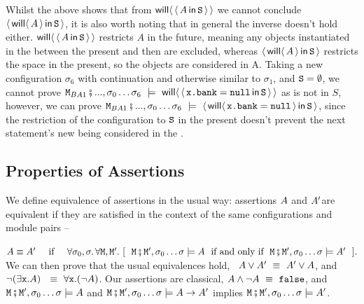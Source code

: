 Whilst the above shows that from $\Future { \Using{A}{\SF} }$ we cannot conclude $\Using { \Future{A} }{\SF}$, it is also worth noting that in general the inverse doesn't hold either. $\Future { \Using{A}{\SF} }$ restricts $A$ in the future, meaning any objects instantiated in the between the present and then are excluded, whereas $\Using { \Future{A} }{\SF}$ restricts the space in the present, so the objects are considered in A. Taking a new configuration $\sigma_6$  with continuation  and otherwise similar to $\sigma_1$, and $\SF = \emptyset$, we cannot prove $\M_{BA1}\mkpair ..., \sigma_0 \ldots \sigma_6 \ \models \ \Future{ \Using { \prg{x.bank} = \prg{null} } {\SF}}$  as  is not in $S$, however, we can prove $\M_{BA1}\mkpair ..., \sigma_0 \ldots \sigma_6 \ \models \ \Using { \Future{ \prg{x.bank} = \prg{null} } } {\SF}$, since the restriction of the configuration to $\SF$ in the present doesn't prevent the next statement's new  being considered in the \Future{\cdot}.


\subsection{Properties of Assertions}

 
\label{sect:classical} 
We define equivalence of   assertions in the usual way: assertions $\A$ and $\A'$are equivalent if they are satisfied  in
the context of the same configurations and module pairs -- \ie\\
 \strut{} \hspace{1.1cm} $\A \equiv \A'\  \IFF\    \forall \sigma_0, \sigma.\, \forall \M, \M'. \ [\ \ \M\mkpair \M', \sigma_0\ldots\sigma \models \A\ \mbox{ if and only if }\ \M\mkpair \M', \sigma_0\ldots\sigma \models \A'\ \ ].$\\
We can then prove that the usual equivalences hold, \eg\  $ \A \vee \A' \ \equiv \  \A' \vee \A$, and\   $\neg (\exists \prg{x}.\A )  \  \ \equiv \  \forall \prg{x}.(\neg  \A)$.
%
Our assertions are classical, \eg  $ \A \wedge\neg \A \ \equiv \  \prg{false}$, and $\M\mkpair \M', \sigma_0 \ldots \sigma  \models \A$ and  $\M\mkpair \M', \sigma_0 \ldots \sigma  \models \A \rightarrow \A'$  implies
$\M\mkpair \M', \sigma_0 \ldots \sigma  \models \A '$. 


